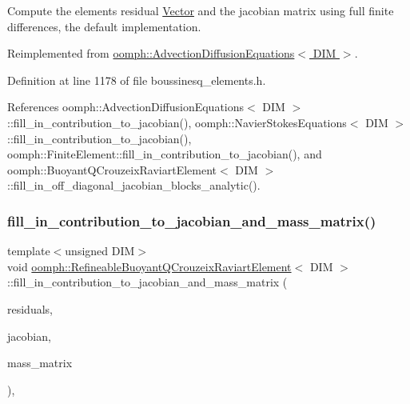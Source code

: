 Compute the element\textquotesingle{}s residual \hyperlink{classoomph_1_1Vector}{Vector} and the jacobian matrix using full finite differences, the default implementation. 



Reimplemented from \hyperlink{classoomph_1_1AdvectionDiffusionEquations_a6ec1e0f92fa79998be9340ecfda4bcd5}{oomph\+::\+Advection\+Diffusion\+Equations$<$ D\+I\+M $>$}.



Definition at line 1178 of file boussinesq\+\_\+elements.\+h.



References oomph\+::\+Advection\+Diffusion\+Equations$<$ D\+I\+M $>$\+::fill\+\_\+in\+\_\+contribution\+\_\+to\+\_\+jacobian(), oomph\+::\+Navier\+Stokes\+Equations$<$ D\+I\+M $>$\+::fill\+\_\+in\+\_\+contribution\+\_\+to\+\_\+jacobian(), oomph\+::\+Finite\+Element\+::fill\+\_\+in\+\_\+contribution\+\_\+to\+\_\+jacobian(), and oomph\+::\+Buoyant\+Q\+Crouzeix\+Raviart\+Element$<$ D\+I\+M $>$\+::fill\+\_\+in\+\_\+off\+\_\+diagonal\+\_\+jacobian\+\_\+blocks\+\_\+analytic().

\mbox{\label{classoomph_1_1RefineableBuoyantQCrouzeixRaviartElement_a06f1e2dbdf7a8ebaa964d421aee453ee}} 
\subsubsection{\texorpdfstring{fill\+\_\+in\+\_\+contribution\+\_\+to\+\_\+jacobian\+\_\+and\+\_\+mass\+\_\+matrix()}{fill\_in\_contribution\_to\_jacobian\_and\_mass\_matrix()}}
{\footnotesize\ttfamily template$<$unsigned D\+IM$>$ \\
void \hyperlink{classoomph_1_1RefineableBuoyantQCrouzeixRaviartElement}{oomph\+::\+Refineable\+Buoyant\+Q\+Crouzeix\+Raviart\+Element}$<$ D\+IM $>$\+::fill\+\_\+in\+\_\+contribution\+\_\+to\+\_\+jacobian\+\_\+and\+\_\+mass\+\_\+matrix (\begin{DoxyParamCaption}\item[{\hyperlink{classoomph_1_1Vector}{Vector}$<$ double $>$ \&}]{residuals,  }\item[{\hyperlink{classoomph_1_1DenseMatrix}{Dense\+Matrix}$<$ double $>$ \&}]{jacobian,  }\item[{\hyperlink{classoomph_1_1DenseMatrix}{Dense\+Matrix}$<$ double $>$ \&}]{mass\+\_\+matrix }\end{DoxyParamCaption})\hspace{0.3cm}{\ttfamily [inline]}, {\ttfamily [virtual]}}

